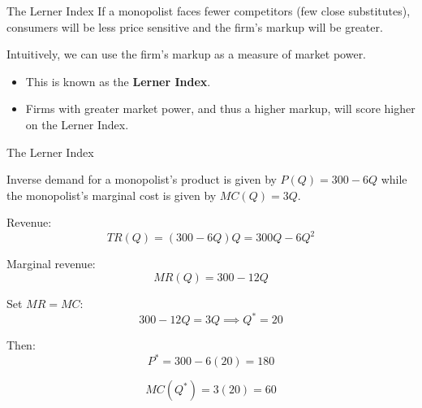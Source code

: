 \documentclass{beamer}
\begin{document}
\begin{frame}{The Lerner Index}
  If a monopolist faces fewer competitors (few close substitutes), consumers will be less price sensitive and the firm's markup will be greater.

  \bigskip
  Intuitively, we can use the firm's markup as a measure of market power.

  \begin{itemize}
    \item This is known as the \textbf{Lerner Index}.
    
    \item Firms with greater market power, and thus a higher markup, will score higher on the Lerner Index.
  \end{itemize}

\end{frame}

\begin{frame}{The Lerner Index}



  Inverse demand for a monopolist's product is given by $P(Q) = 300-6Q$ while the monopolist's marginal cost is given by $MC(Q) = 3Q$. 
  
\end{frame}

\begin{frame}[shrink]



Revenue:
\[
TR(Q)=(300-6Q)Q=300Q-6Q^2
\]

Marginal revenue:
\[
MR(Q)=300-12Q
\]

Set \(MR=MC\):
\[
300-12Q=3Q \implies Q^*=20
\]

Then:
\[
P^*=300-6(20)=180
\]

\[
MC(Q^*)=3(20)=60
\]

\begin{center}
\end{center}

\end{frame}

\end{document}
